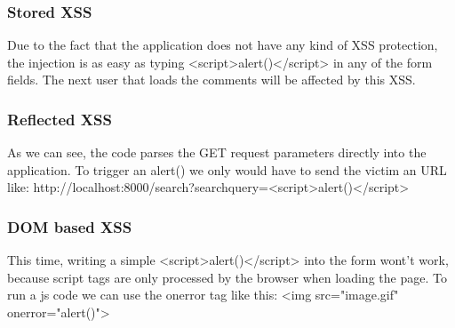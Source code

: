 \begin{Answer}[ref={websec-xss-types}]
	\subsubsection{Stored XSS}
	Due to the fact that the application does not have any kind of XSS protection, the injection is as easy as typing <script>alert()</script> in any of the form fields. The next user that loads the comments will be affected by this XSS.
	\subsubsection{Reflected XSS}
	As we can see, the code parses the GET request parameters directly into the application. To trigger an alert() we only would have to send the victim an URL like: http://localhost:8000/search?searchquery=<script>alert()</script>
	\subsubsection{DOM based XSS}
	This time, writing a simple <script>alert()</script> into the form wont't work, because script tags are only processed by the browser when loading the page. To run a js code we can use the onerror tag like this: <img src="image.gif" onerror="alert()">
\end{Answer}